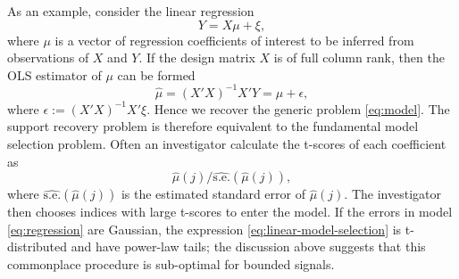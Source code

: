 As an example, consider the linear regression
\begin{equation} \label{eq:regression}
 Y = X\mu + \xi,
\end{equation}
where $\mu$ is a vector of regression coefficients of interest to be inferred from observations of $X$ and $Y$.
If the design matrix $X$ is of full column rank, then the OLS estimator of $\mu$ can be formed 
\begin{equation*}
    \widehat{\mu} = \left(X'X\right)^{-1}X'Y = \mu + \epsilon,
\end{equation*}
where $\epsilon := (X'X)^{-1}X'\xi$.
Hence we recover the generic problem \eqref{eq:model}. 
The support recovery problem is therefore equivalent to the fundamental model selection problem.
Often an investigator calculate the t-scores of each coefficient as 
\begin{equation} \label{eq:linear-model-selection}
    \widehat{\mu}(j) \Big/ \widehat{\mathrm{s.e.}}(\widehat{\mu}(j)),
\end{equation}
where $\widehat{\mathrm{s.e.}}(\widehat{\mu}(j))$ is the estimated standard error of $\widehat{\mu}(j)$.
The investigator then chooses indices with large t-scores to enter the model.
If the errors in model \eqref{eq:regression} are Gaussian, the expression \eqref{eq:linear-model-selection} is t-distributed and have power-law tails; the discussion above suggests that this commonplace procedure is sub-optimal for bounded signals.



